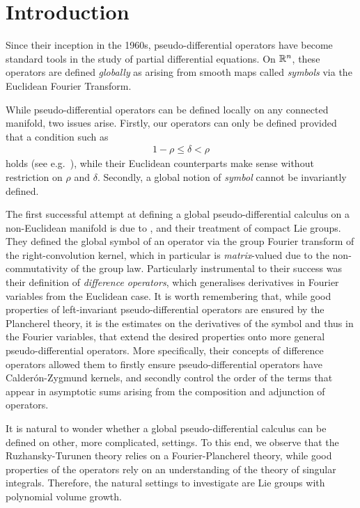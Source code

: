 \chapter{Introduction}

Since their inception in the 1960s,
pseudo-differential operators have become standard tools in the study of partial differential equations.
On $\mathbb{R}^n$,
these operators are defined \emph{globally} as arising from smooth maps called \emph{symbols} via the Euclidean Fourier Transform.

While pseudo-differential operators can be defined locally on any connected manifold,
two issues arise.
Firstly,
our operators can only be defined provided that a condition such as
\begin{align*}
    1 - \rho \leq \delta < \rho
\end{align*}
holds (see e.g.~\cite[Section 4]{Shubin01}),
while their Euclidean counterparts make sense without restriction on $\rho$ and $\delta$.
Secondly,
a global notion of \emph{symbol} cannot be invariantly defined.

The first successful attempt at defining a global pseudo-differential calculus
on a non-Euclidean manifold is due to \citeauthor{RuzhanskyTurunen10},
and their treatment of compact Lie groups.
They defined the global symbol of an operator via the group Fourier transform of the right-convolution kernel,
which in particular is  \emph{matrix}-valued
due to the non-commutativity of the group law.
Particularly instrumental to their success was their definition of \emph{difference operators},
which generalises derivatives in Fourier variables from the Euclidean case.
It is worth remembering that,
while good properties of left-invariant pseudo-differential operators
are ensured by the Plancherel theory,
it is the estimates on the derivatives of the symbol and thus in the Fourier variables,
that extend the desired properties onto more general pseudo-differential operators.
More specifically,
their concepts of difference operators allowed them to firstly ensure pseudo-differential operators
have Calder\'on-Zygmund kernels,
and secondly control the order of the terms that appear in asymptotic sums
arising from the composition and adjunction of operators.

It is natural to wonder whether a global pseudo-differential calculus can be defined on other,
more complicated, settings.
To this end,
we observe that the Ruzhansky-Turunen theory relies on a Fourier-Plancherel theory,
while good properties of the operators rely on an understanding of the theory of singular integrals.
Therefore,
the natural settings to investigate are Lie groups with polynomial volume growth.

